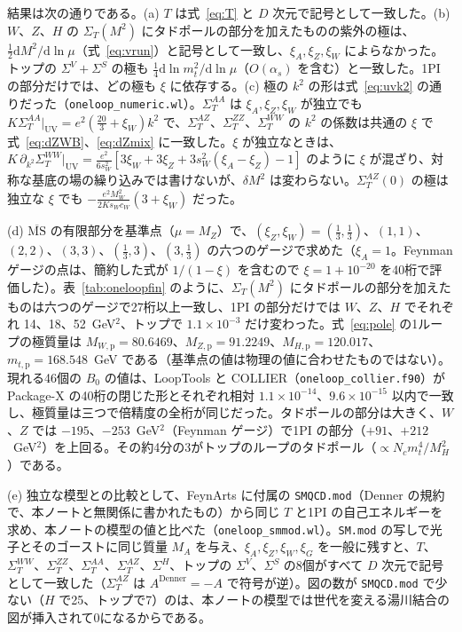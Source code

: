 \documentclass[a4paper,10pt]{ltjsarticle}
\newcommand{\dd}{\mathrm{d}}
\newcommand{\MSbar}{\overline{\mathrm{MS}}}
\newcommand{\sw}{s_W}
\newcommand{\cw}{c_W}
\begin{document}
結果は次の通りである。(a) $T$ は式~\eqref{eq:T} と $D$ 次元で記号として一致した。(b) $W$、$Z$、$H$ の $\Sigma_T(M^2)$ にタドポールの部分を加えたものの紫外の極は、$\frac12\dd M^2/\dd\ln\mu$（式~\eqref{eq:vrun}）と記号として一致し、$\xi_A,\xi_Z,\xi_W$ によらなかった。トップの $\Sigma^V+\Sigma^S$ の極も $\frac14\dd\ln m_t^2/\dd\ln\mu$（$O(\alpha_s)$ を含む）と一致した。1PI の部分だけでは、どの極も $\xi$ に依存する。(c) 極の $k^2$ の形は式~\eqref{eq:uvk2} の通りだった（\texttt{oneloop\_numeric.wl}）。$\Sigma^{AA}_T$ は $\xi_A,\xi_Z,\xi_W$ が独立でも $K\Sigma^{AA}_T|_{\mathrm{UV}}=e^2(\frac{20}3+\xi_W)k^2$ で、$\Sigma^{AZ}_T$、$\Sigma^{ZZ}_T$、$\Sigma^{WW}_T$ の $k^2$ の係数は共通の $\xi$ で式~\eqref{eq:dZWB}、\eqref{eq:dZmix} に一致した。$\xi$ が独立なときは、$K\,\partial_{k^2}\Sigma^{WW}_T|_{\mathrm{UV}}=\frac{e^2}{6\sw^2}[3\xi_W+3\xi_Z+3\sw^2(\xi_A-\xi_Z)-1]$ のように $\xi$ が混ざり、対称な基底の場の繰り込みでは書けないが、$\delta M^2$ は変わらない。$\Sigma^{AZ}_T(0)$ の極は独立な $\xi$ でも $-\frac{e^2M_W^2}{2K\sw\cw}(3+\xi_W)$ だった。

(d) $\MSbar$ の有限部分を基準点（$\mu=M_Z$）で、$(\xi_Z,\xi_W)=(\frac13,\frac13)$、$(1,1)$、$(2,2)$、$(3,3)$、$(\frac13,3)$、$(3,\frac13)$ の六つのゲージで求めた（$\xi_A=1$。Feynman ゲージの点は、簡約した式が $1/(1-\xi)$ を含むので $\xi=1+10^{-20}$ を40桁で評価した）。表~\ref{tab:oneloopfin} のように、$\Sigma_T(M^2)$ にタドポールの部分を加えたものは六つのゲージで27桁以上一致し、1PI の部分だけでは $W$、$Z$、$H$ でそれぞれ 14、18、52~GeV$^2$、トップで $1.1\times10^{-3}$ だけ変わった。式~\eqref{eq:pole} の1ループの極質量は $M_{W,\mathrm p}=80.6469$、$M_{Z,\mathrm p}=91.2249$、$M_{H,\mathrm p}=120.017$、$m_{t,\mathrm p}=168.548$~GeV である（基準点の値は物理の値に合わせたものではない）。現れる46個の $B_0$ の値は、LoopTools と COLLIER（\texttt{oneloop\_collier.f90}）が Package-X の40桁の閉じた形とそれぞれ相対 $1.1\times10^{-14}$、$9.6\times10^{-15}$ 以内で一致し、極質量は三つで倍精度の全桁が同じだった。タドポールの部分は大きく、$W$、$Z$ では $-195$、$-253$~GeV$^2$（Feynman ゲージ）で1PI の部分（$+91$、$+212$~GeV$^2$）を上回る。その約4分の3がトップのループのタドポール（$\propto N_cm_t^4/M_H^2$）である。

(e) 独立な模型との比較として、FeynArts に付属の \texttt{SMQCD.mod}（Denner の規約で、本ノートと無関係に書かれたもの）から同じ $T$ と1PI の自己エネルギーを求め、本ノートの模型の値と比べた（\texttt{oneloop\_smmod.wl}）。\texttt{SM.mod} の写しで光子とそのゴーストに同じ質量 $M_A$ を与え、$\xi_A,\xi_Z,\xi_W,\xi_G$ を一般に残すと、$T$、$\Sigma^{WW}_T$、$\Sigma^{ZZ}_T$、$\Sigma^{AA}_T$、$\Sigma^{AZ}_T$、$\Sigma^H$、トップの $\Sigma^V$、$\Sigma^S$ の8個がすべて $D$ 次元で記号として一致した（$\Sigma^{AZ}_T$ は $A^{\mathrm{Denner}}=-A$ で符号が逆）。図の数が \texttt{SMQCD.mod} で少ない（$H$ で25、トップで7）のは、本ノートの模型では世代を変える湯川結合の図が挿入されて0になるからである。
\end{document}
